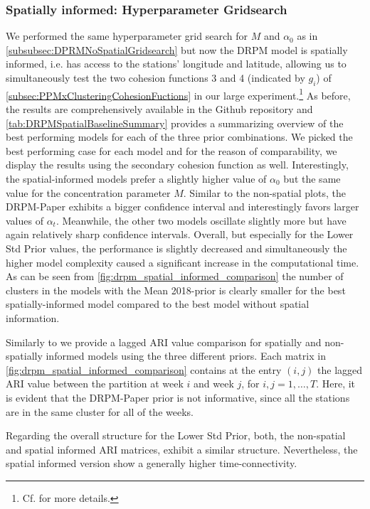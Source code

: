 \documentclass[12pt,a4paper]{article}
\begin{document}
\subsubsection{Spatially informed: Hyperparameter Gridsearch}
We performed the same hyperparameter grid search for $M$ and $\alpha_0$ as in \cref{subsubsec:DPRMNoSpatialGridsearch} but now the
DRPM model is spatially informed, i.e. has access to the stations' longitude and latitude, allowing us to simultaneously 
test the two cohesion functions 3 and 4 (indicated by $g_i$) of \cref{subsec:PPMxClusteringCohesionFuctions} in our large experiment.\footnote{Cf.
\cite[Section 4.2]{Page2021-Temporal} for more details.}
As before, the results are comprehensively available in the Github repository and \cref{tab:DRPMSpatialBaselineSummary}
provides a summarizing overview of
the best performing models for each of the three prior combinations. We picked the best performing case for each model and
for the reason of comparability, we display the results using the secondary cohesion function as well. Interestingly,
the spatial-informed models prefer a slightly higher value of $\alpha_0$ but the same value for the concentration parameter
$M$. Similar to the non-spatial plots, the DRPM-Paper exhibits
a bigger confidence interval and interestingly favors larger
values of $\alpha_t$. Meanwhile, the other two models oscillate slightly
more but have again relatively sharp confidence intervals. 
Overall, but especially for the Lower Std Prior values, the performance is slightly decreased and simultaneously
the higher model complexity caused a significant increase in the computational time. As can be seen from \ref{fig:drpm_spatial_informed_comparison} the number of clusters in the models with the Mean 2018-prior is clearly smaller for the best spatially-informed model compared to the best model without spatial information.

Similarly to \cite{Page2022-SpatioTemporal} we provide a
lagged ARI value comparison for spatially
and non-spatially informed models using the three
different priors. Each matrix in 
\cref{fig:drpm_spatial_informed_comparison}
contains at the entry 
$(i,j)$ the lagged ARI value between the partition at week
$i$ and week $j$, for $i, j= 1, \ldots, T$. Here, it is evident
that the DRPM-Paper prior is not informative, 
since all the stations are in the same cluster for all of
the weeks.

Regarding the overall structure for the Lower Std Prior, both,
the non-spatial and spatial informed ARI matrices, exhibit a similar
structure. Nevertheless, the spatial informed version show
a generally higher time-connectivity.
\end{document}
